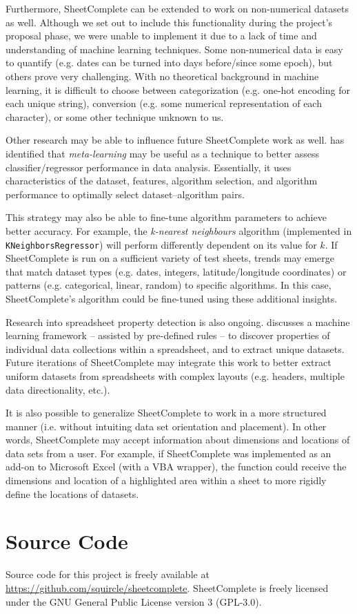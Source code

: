 \documentclass[conference]{IEEEtran}
\begin{document}
Furthermore, SheetComplete can be extended to work on non-numerical datasets as well. Although we set out to include this functionality during the project's proposal phase, we were unable to implement it due to a lack of time and understanding of machine learning techniques. Some non-numerical data is easy to quantify (e.g. dates can be turned into days before/since some epoch), but others prove very challenging. With no theoretical background in machine learning, it is difficult to choose between categorization (e.g. one-hot encoding for each unique string), conversion (e.g. some numerical representation of each character), or some other technique unknown to us.

Other research may be able to influence future SheetComplete work as well. \cite{nural_using_2017} has identified that \textit{meta-learning} may be useful as a technique to better assess classifier/regressor performance in data analysis. Essentially, it uses characteristics of the dataset, features, algorithm selection, and algorithm performance to optimally select dataset--algorithm pairs. 

\balance

This strategy may also be able to fine-tune algorithm parameters to achieve better accuracy. For example, the \textit{k-nearest neighbours} algorithm (implemented in \texttt{KNeighborsRegressor}) will perform differently dependent on its value for $k$. If SheetComplete is run on a sufficient variety of test sheets, trends may emerge that match dataset types (e.g. dates, integers, latitude/longitude coordinates) or patterns (e.g. categorical, linear, random) to specific algorithms. In this case, SheetComplete's algorithm could be fine-tuned using these additional insights.

Research into spreadsheet property detection is also ongoing. \cite{chen_spreadsheet_2017} discusses a machine learning framework -- assisted by pre-defined rules -- to discover properties of individual data collections within a spreadsheet, and to extract unique datasets. Future iterations of SheetComplete may integrate this work to better extract uniform datasets from spreadsheets with complex layouts (e.g. headers, multiple data directionality, etc.). 

It is also possible to generalize SheetComplete to work in a more structured manner (i.e. without intuiting data set orientation and placement). In other words, SheetComplete may accept information about dimensions and locations of data sets from a user. For example, if SheetComplete was implemented as an add-on to Microsoft Excel (with a VBA wrapper), the function could receive the dimensions and location of a highlighted area within a sheet to more rigidly define the locations of datasets.

\section*{Source Code}
Source code for this project is freely available at \mbox{\url{https://github.com/squircle/sheetcomplete}}. SheetComplete is freely licensed under the GNU General Public License version 3 (GPL-3.0).


\end{document}
